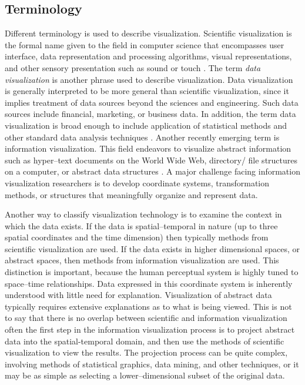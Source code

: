 \subsection{Terminology}
Different terminology is used to describe visualization. Scientific visualization is the formal name given to the field in computer science that encompasses user interface, data representation and processing algorithms, visual representations, and other sensory presentation such as sound or touch \cite{McCormick87}.
The term \emph{data visualization} is another phrase used to describe visualization. Data visualization is generally interpreted to be more general than scientific visualization, since it implies treatment of data sources beyond the sciences and engineering. Such data sources include financial, marketing, or business data. In addition, the term data visualization is broad enough to include application of statistical methods and other standard data analysis techniques \cite{Rosenblum94}.
Another recently emerging term is information visualization. This field endeavors to visualize abstract information such as hyper--text documents on the World Wide Web, directory/ file structures on a computer, or abstract data structures \cite{InfoVis95}.
A major challenge facing information visualization researchers is to develop coordinate systems, transformation methods, or structures that meaningfully organize and represent data.

Another way to classify visualization technology is to examine the context in which the data exists. If the data is spatial--temporal in nature (up to three spatial coordinates and the time dimension) then typically methods from scientific visualization are used. If the data exists in higher dimensional spaces, or abstract spaces, then methods from information visualization are used.
This distinction is important, because the human perceptual system is highly tuned to space--time relationships.
Data expressed in this coordinate system is inherently understood with little need for explanation. Visualization of abstract data typically requires extensive explanations as to what is being viewed. This is not to say that there is no overlap between scientific and information visualization often the first step in the information visualization process is to project abstract data into the spatial-temporal domain, and then use the methods of scientific visualization to view the results. The projection process can be quite complex, involving methods of statistical graphics, data
mining, and other techniques, or it may be as simple as selecting a lower--dimensional subset of the original data.

